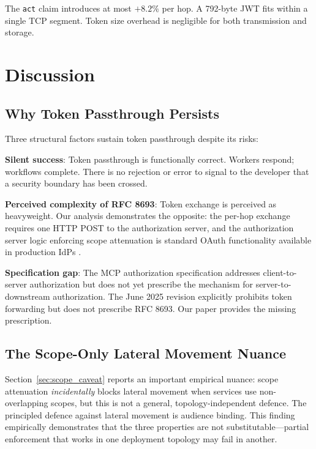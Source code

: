 \documentclass[journal]{IEEEtran}
\begin{document}
The \texttt{act} claim introduces at most $+8.2\%$ per hop. A 792-byte JWT
fits within a single TCP segment. Token size overhead is negligible for both
transmission and storage.


\section{Discussion}
\label{sec:discussion}

\subsection{Why Token Passthrough Persists}

Three structural factors sustain token passthrough despite its risks:

\textbf{Silent success}: Token passthrough is functionally correct. Workers
respond; workflows complete. There is no rejection or error to signal to the
developer that a security boundary has been crossed.

\textbf{Perceived complexity of RFC 8693}: Token exchange is perceived as
heavyweight. Our analysis demonstrates the opposite: the per-hop exchange
requires one HTTP POST to the authorization server, and the authorization server
logic enforcing scope attenuation is standard OAuth functionality available in
production IdPs \cite{rfc8693_deploy}.

\textbf{Specification gap}: The MCP authorization specification
\cite{mcp_spec_2025} addresses client-to-server authorization but does not yet
prescribe the mechanism for server-to-downstream authorization. The June 2025
revision explicitly prohibits token forwarding but does not prescribe RFC 8693.
Our paper provides the missing prescription.

\subsection{The Scope-Only Lateral Movement Nuance}

Section~\ref{sec:scope_caveat} reports an important empirical nuance: scope
attenuation \textit{incidentally} blocks lateral movement when services use
non-overlapping scopes, but this is not a general, topology-independent defence.
The principled defence against lateral movement is audience binding. This
finding empirically demonstrates that the three properties are not
substitutable---partial enforcement that works in one deployment topology may fail
in another.
\end{document}
